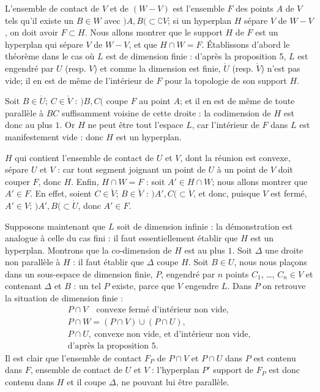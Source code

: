 \documentclass[11pt]{article}
\newcommand{\bzcf}[2]{#1}
\newenvironment{proof}[1][]{\par}{\par}
\begin{document}
\begin{proof}
L'ensemble de contact de $V$ et de $(W-V)$ est l'ensemble $F$ des points $A$ de $V$ tels qu'il
existe un $B\in W$ avec $)A, B(\subset\complement V$; si un hyperplan $H$ sépare $V$ de $W-V$, on
doit avoir $F\subset H$. Nous allons montrer que le support $H$ de $F$ est un hyperplan qui sépare
$V$ de $W-V$, et que $H\cap W=F$. Établissons d'abord le théorème dans le cas où $L$ est de
dimension finie : d'après \bzcf{la proposition 5}{\ref{bzprop:c3s5p5_support_complementaire}},
$L$ est engendré par $U$ (resp. $V$) et comme la dimension est finie, $\mathring{U}$ (resp.
$\mathring{V}$) n'est pas vide; il en est de même de l'intérieur de $F$ pour la topologie de son
support $H$.

Soit $B\in\mathring{U}$; $C\in\mathring{V}$ : $)B, C($ coupe $F$ au point $A$; et il en est de
même de toute parallèle à $BC$ suffisamment voisine de cette droite : la codimension de $H$ est
donc au plus $1$. Or $H$ ne peut être tout l'espace $L$, car l'intérieur de $F$ dans $L$ est
manifestement vide : donc $H$ est un hyperplan.

$H$ qui contient l'ensemble de contact de $U$ et $V$, dont la réunion est convexe, sépare $U$ et
$V$ : car tout segment joignant un point de $U$ à un point de $V$ doit couper $F$, donc $H$.
Enfin, $H\cap W=F$ : soit $A'\in H\cap W$; nous allons montrer que $A'\in F$. En effet, soient
$C\in\mathring{V}$; $B\in\mathring{V}$ : $)A', C(\subset\mathring{V}$, et donc, puisque $V$ est
fermé, $A'\in V$; $)A', B(\subset\mathring{U}$, donc $A'\in F$.

Supposons maintenant que $L$ soit de dimension infinie : la démonstration est analogue à celle
du cas fini : il faut essentiellement établir que $H$ est un hyperplan. Montrons que la
co-dimension de $H$ est au plus $1$. Soit $\Delta$ une droite non parallèle à $H$ : il faut
établir que $\Delta$ coupe $H$. Soit $B\in U$, nous nous plaçons dans un sous-espace de dimension
finie, $P$, engendré par $n$
points $C_1$, \ldots, $C_n\in V$ et contenant $\Delta$ et $B$ : un tel $P$ existe, parce que $V$
engendre $L$. Dans $P$ on retrouve la situation de dimension finie :
\[ \begin{gathered} P\cap V\quad\text{convexe fermé d'intérieur non vide,}\\
P\cap W=(P\cap V)\cup(P\cap U),\\
P\cap U,\ \text{convexe non vide, et d'intérieur non vide,}\\
\text{d'après \bzcf{la proposition 5}{\ref{bzprop:c3s5p5_support_complementaire}}.}
\end{gathered} \]
Il est clair que l'ensemble de contact $F_P$ de $P\cap V$ et $P\cap U$ dans $P$ est contenu dans
$F$, ensemble de contact de $U$ et $V$ : l'hyperplan $P'$ support de $F_P$ est donc contenu dans
$H$ et il coupe $\Delta$, ne pouvant lui être parallèle.


\end{proof}
\end{document}
